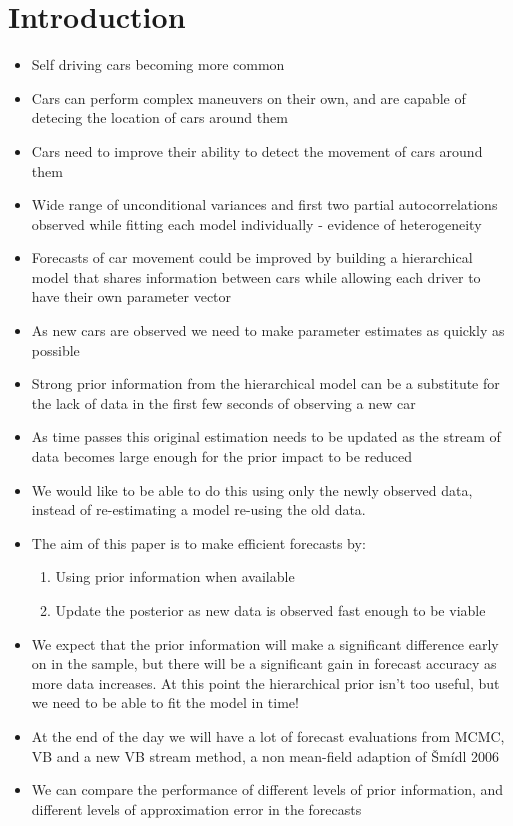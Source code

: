 \documentclass[12pt,a4paper]{article}\usepackage[]{graphicx}\usepackage[]{color}
\begin{document}
\section{Introduction}

\begin{itemize}
\item Self driving cars becoming more common
\item Cars can perform complex maneuvers on their own, and are capable of detecing the location of cars around them
\item Cars need to improve their ability to detect the movement of cars around them
\item Wide range of unconditional variances and first two partial autocorrelations observed while fitting each model individually - evidence of heterogeneity
\item Forecasts of car movement could be improved by building a hierarchical model that shares information between cars while allowing each driver to have their own parameter vector
\item As new cars are observed we need to make parameter estimates as quickly as possible
\item Strong prior information from the hierarchical model can be a substitute for the lack of data in the first few seconds of observing a new car
\item As time passes this original estimation needs to be updated as the stream of data becomes large enough for the prior impact to be reduced
\item We would like to be able to do this using only the newly observed data, instead of re-estimating a model re-using the old data.
\item The aim of this paper is to make efficient forecasts by:
\begin{enumerate}
\item Using prior information when available
\item Update the posterior as new data is observed fast enough to be viable
\end{enumerate}
\item We expect that the prior information will make a significant difference early on in the sample, but there will be a significant gain in forecast accuracy as more data increases. At this point the hierarchical prior isn't too useful, but we need to be able to fit the model in time!
\item At the end of the day we will have a lot of forecast evaluations from MCMC, VB and a new VB stream method, a non mean-field adaption of {\v S}m{\'i}dl 2006
\item We can compare the performance of different levels of prior information, and different levels of approximation error in the forecasts
\end{itemize}
\end{document}
